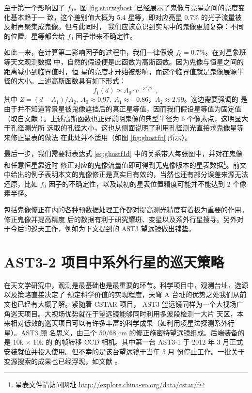 至于第一个影响因子 $f_0$，图 \ref{fig:starwghost} 已经展示了鬼像与亮星之间的亮度变化基本趋于一
致，这个差别值大概为 5.4 星等，即对应亮星 0.7\% 的光子流量被反射再聚集成鬼像。但与此同时，
我们应该意识到实际中的鬼像更加复杂：不同的位置、星等都会给 $f_0$ 因子带来不确定性。

如此一来，在计算第二影响因子的过程中，我们一律假设 $f_0 =  0.7\% $。在对星象班等天文观测数据
中，自然的假设便是此函数为高斯函数。因为鬼像与恒星之间的距离减小到临界值时，恒
星的亮度才开始被影响，而这个临界值就是鬼像展源半径的大小。上述高斯函数具有如下形式：
\begin{equation} \label{eq:ghostf1d}
f_1(d) \simeq A_0 \cdot e^{-Z^2/2} \ \ , 
\end{equation} 
其中 $Z = (d-A_1)/A_2,\ A_0 \approx 0.97,\ A_1 \approx -0.86$，$A_2 \approx 2.99$。这边需要强调的
是由于并不知道背景星被鬼像遮挡后的真正星等值，因而我们假设星等值为固定值（取自文献 
）。上述高斯函数也正好说明鬼像的典型半径为 6 个像素点，这明显大于孔径测光所
选取的孔径大小\cite{ZhouX2010b}，这也从侧面说明了利用孔径测光直接求鬼像星等来修正星表的做法
在此处并不适用（如图 \ref{fig:ghostfit} 所示）。

最后一步，我们需要将表达式 \ref{eq:ghostf1d} 中的关系带入每张图中，并对在鬼像和任意恒星靠近时
修正对应的鬼像流量值即可得到无鬼像版本的星表数据\footnote{星表文件请访问网址 \url{http://explore.china-vo.org/data/cstar/f}}。前文中给出的例子表明本文的鬼像修正是真实且有效的，当然也还有部分误差来源无法还原，比如 $f_0$ 因子的不确定性，以及最初的星表位置精度可能并不能达到 2 个像素半径。

包括鬼像修正在内的各种预数据处理工作都对提高测光精度有着极为重要的作用。修正鬼像并提高精度
后的数据有利于研究耀斑、变星以及系外行星搜寻\cite{Liang2016,Yang2015,Wang2014CSTAR}。另外对于今后的巡天工作，例如为下文提到的 AST3 望远镜做出铺垫\cite{Cui2008}。


\section{AST3-2 项目中系外行星的巡天策略} \label{sec:ast3}

在天文学研究中，观测是最基础也是最重要的环节。科学项目中，观测台址，选源以及策略直接决定了
预定科学价值的实现程度，天穹 A 台址的优势之处我们从前文也已经有大概了解。紧随着 CSTAR 项目，
AST3 望远镜同样为一个大视场广角巡天项目。大视场优势就在于望远镜能够同时利用多波段检测一大片
天区，本来相对低效的巡天项目可以有许多丰富的科学成果（如利用凌星法探测系外行星）。AST3 顾
名思义，由三个 50/68 cm 的修正施密特望远镜组成。后端装备的是 10k $\times$ 10k 的 的帧转移 CCD 
相机。其中第一台 AST3-1 于 2012 年 3 月正式安装就位并投入使用。但不幸的是该台望远镜于当年 5 月
份停止工作。一批关于变源搜索的成果也已经浮现，如文献 。

